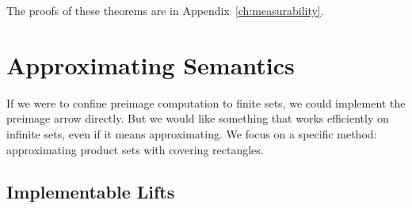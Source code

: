 The proofs of these theorems are in Appendix~\ref{ch:measurability}.



\section{Approximating Semantics}
\label{sec:approximating-semantics}

If we were to confine preimage computation to finite sets, we could implement the preimage arrow directly.
But we would like something that works efficiently on infinite sets, even if it means approximating.
We focus on a specific method: approximating product sets with covering rectangles.

\subsection{Implementable Lifts}

